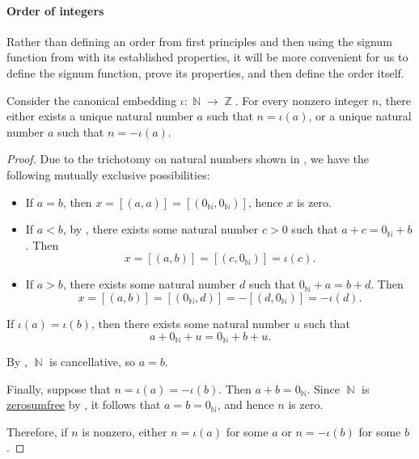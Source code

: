 \paragraph{Order of integers}

Rather than defining an order from first principles and then using the signum function from  with its established properties, it will be more convenient for us to define the signum function, prove its properties, and then define the order itself.

\begin{lemma}\label{thm:integer_signum_lemma}
  Consider the canonical embedding \( \iota: \BbbN \to \BbbZ \). For every nonzero integer \( n \), there either exists a unique natural number \( a \) such that \( n = \iota(a) \), or a unique natural number \( a \) such that \( n = -\iota(a) \).
\end{lemma}
\begin{proof}
  \ExistenceSubProof Due to the trichotomy on natural numbers shown in , we have the following mutually exclusive possibilities:
  \begin{itemize}
    \item If \( a = b \), then \( x = [(a, a)] = [(0_\BbbN, 0_\BbbN)] \), hence \( x \) is zero.
    \item If \( a < b \), by , there exists some natural number \( c > 0 \) such that \( a + c = 0_\BbbN + b \). Then
    \begin{equation*}
      x = [(a, b)] = [(c, 0_\BbbN)] = \iota(c).
    \end{equation*}

    \item If \( a > b \), there exists some natural number \( d \) such that \( 0_\BbbN + a = b + d \). Then
    \begin{equation*}
      x = [(a, b)] = [(0_\BbbN, d)] = -[(d, 0_\BbbN)] = -\iota(d).
    \end{equation*}
  \end{itemize}

  \UniquenessSubProof If \( \iota(a) = \iota(b) \), then there exists some natural number \( u \) such that
  \begin{equation*}
     a + 0_\BbbN + u = 0_\BbbN + b + u.
  \end{equation*}

  By , \( \BbbN \) is cancellative, so \( a = b \).

   Finally, suppose that \( n = \iota(a) = -\iota(b) \). Then \( a + b = 0_\BbbN \). Since \( \BbbN \) is \hyperref[def:zerosumfree]{zerosumfree} by , it follows that \( a = b = 0_\BbbN \), and hence \( n \) is zero.

  Therefore, if \( n \) is nonzero, either \( n = \iota(a) \) for some \( a \) or \( n = -\iota(b) \) for some \( b \).
\end{proof}

